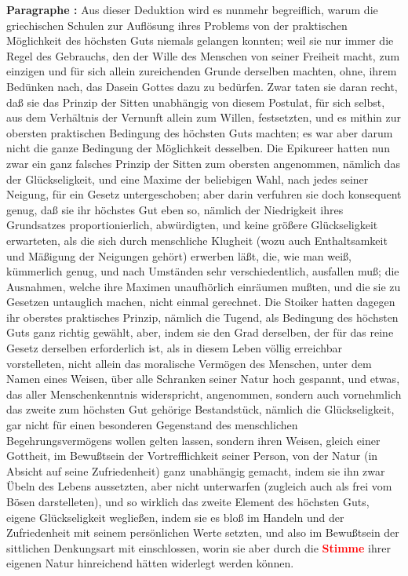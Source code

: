 \documentclass[a4paper,12pt,twoside]{book}
\newcommand{\match}[1]{\textcolor{red}{\textbf{#1}}}
\begin{document}
	\textbf{Paragraphe : }Aus dieser Deduktion wird es nunmehr begreiflich, warum die griechischen Schulen zur Auflösung ihres Problems von der praktischen Möglichkeit des höchsten Guts niemals gelangen konnten; weil sie nur immer die Regel des Gebrauchs, den der Wille des Menschen von seiner Freiheit macht, zum einzigen und für sich allein zureichenden Grunde derselben machten, ohne, ihrem Bedünken nach, das Dasein Gottes dazu zu bedürfen. Zwar taten sie daran recht, daß sie das Prinzip der Sitten unabhängig von diesem Postulat, für sich selbst, aus dem Verhältnis der Vernunft allein zum Willen, festsetzten, und es mithin zur obersten praktischen Bedingung des höchsten Guts machten; es war aber darum nicht die ganze Bedingung der Möglichkeit desselben. Die Epikureer hatten nun zwar ein ganz falsches Prinzip der Sitten zum obersten angenommen, nämlich das der Glückseligkeit, und eine Maxime der beliebigen Wahl, nach jedes seiner Neigung, für ein Gesetz untergeschoben; aber darin verfuhren sie doch konsequent genug, daß sie ihr höchstes Gut eben so, nämlich der Niedrigkeit ihres Grundsatzes proportionierlich, abwürdigten, und keine größere Glückseligkeit erwarteten, als die sich durch menschliche Klugheit (wozu auch Enthaltsamkeit und Mäßigung der Neigungen gehört) erwerben läßt, die, wie man weiß, kümmerlich genug, und nach Umständen sehr verschiedentlich, ausfallen muß; die Ausnahmen, welche ihre  Maximen unaufhörlich einräumen mußten, und die sie zu Gesetzen untauglich machen, nicht einmal gerechnet. Die Stoiker hatten dagegen ihr oberstes praktisches Prinzip, nämlich die Tugend, als Bedingung des höchsten Guts ganz richtig gewählt, aber, indem sie den Grad derselben, der für das reine Gesetz derselben erforderlich ist, als in diesem Leben völlig erreichbar vorstelleten, nicht allein das moralische Vermögen des Menschen, unter dem Namen eines Weisen, über alle Schranken seiner Natur hoch gespannt, und etwas, das aller Menschenkenntnis widerspricht, angenommen, sondern auch vornehmlich das zweite zum höchsten Gut gehörige Bestandstück, nämlich die Glückseligkeit, gar nicht für einen besonderen Gegenstand des menschlichen Begehrungsvermögens wollen gelten lassen, sondern ihren Weisen, gleich einer Gottheit, im Bewußtsein der Vortrefflichkeit seiner Person, von der Natur (in Absicht auf seine Zufriedenheit) ganz unabhängig gemacht, indem sie ihn zwar Übeln des Lebens aussetzten, aber nicht unterwarfen (zugleich auch als frei vom Bösen darstelleten), und so wirklich das zweite Element des höchsten Guts, eigene Glückseligkeit wegließen, indem sie es bloß im Handeln und der Zufriedenheit mit seinem persönlichen Werte setzten, und also im Bewußtsein der sittlichen Denkungsart mit einschlossen, worin sie aber durch die \match{Stimme} ihrer eigenen Natur hinreichend hätten widerlegt werden können. 
	
\end{document}
